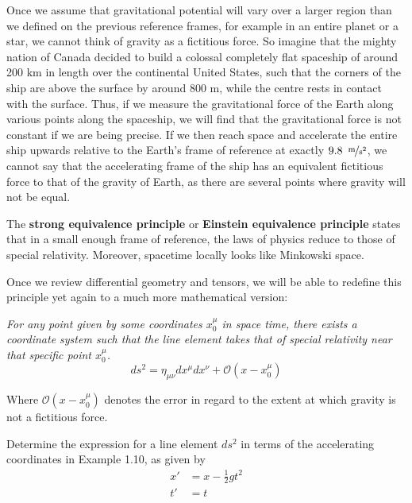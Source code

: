 \documentclass{article}
\begin{document}
\begin{exmp}
 			Once we assume that gravitational potential will vary over a larger region than we defined on the previous reference frames, for example in an entire planet or a star, we cannot think of gravity as a fictitious force. So imagine that the mighty nation of Canada decided to build a colossal completely flat spaceship of around 200 km in length over the continental United States, such that the corners of the ship are above the surface by around 800 m, while the centre rests in contact with the surface.
 			Thus, if we measure the gravitational force of the Earth along various points along the spaceship, we will find that the gravitational force is not constant if we are being precise. If we then reach space and accelerate the entire ship upwards relative to the Earth's frame of reference at exactly $9.8 \,\,\, \nicefrac{\text{m}}{\text{s}^2}$, we cannot say that the accelerating frame of the ship has an equivalent fictitious force to that of the gravity of Earth, as there are several points where gravity will not be equal. 
 			
 			\begin{defn}
 				The \textbf{strong equivalence principle} or \textbf{Einstein equivalence principle} states that in a small enough frame of reference, the laws of physics reduce to those of special relativity. Moreover, spacetime locally looks like Minkowski space.
 			\end{defn}
 		
 			Once we review differential geometry and tensors, we will be able to redefine this principle yet again to a much more mathematical version:
 			
 				\textit{For any point given by some coordinates $x_0^\mu$ in space time, there exists a coordinate system such that the line element takes that of special relativity near that specific point $x_0^\mu$. }
 				$$ ds^2 = \eta_{\mu\nu} dx^\mu dx^\nu + \mathcal{O}(x-x_0^\mu) $$
 		\end{exmp} \noindent
 		Where $\mathcal{O} (x-x_0^\mu)$ denotes the error in regard to the extent at which gravity is not a fictitious force.
 		\begin{exe}
 			Determine the expression for a line element $ds^2$ in terms of the accelerating coordinates in Example 1.10, as given by
 			\begin{align*}
 				x' &= x - \frac12 gt^2 \\
 				t' &= t
 			\end{align*}
 		\end{exe}
 	\pagebreak
\end{document}
